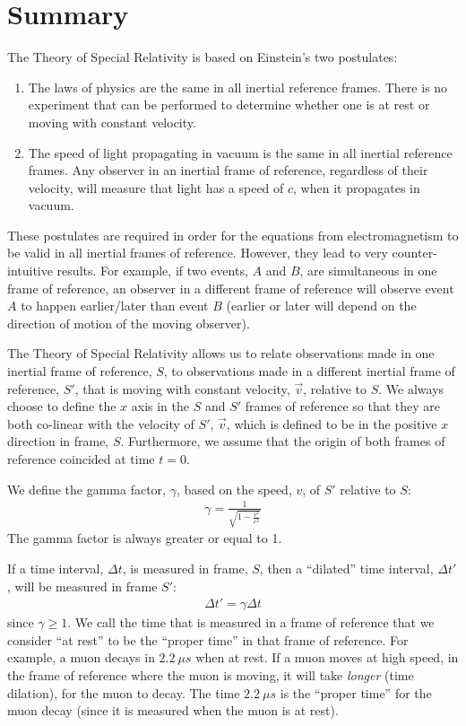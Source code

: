 \section{Summary}
\vspace{-0.25cm}
\begin{chapterSummary}
The Theory of Special Relativity is based on Einstein's two postulates:
\begin{enumerate}
\item The laws of physics are the same in all inertial reference frames. There is no experiment that can be performed to determine whether one is at rest or moving with constant velocity.
\item The speed of light propagating in vacuum is the same in all inertial reference frames. Any observer in an inertial frame of reference, regardless of their velocity, will measure that light has a speed of $c$, when it propagates in vacuum. 
\end{enumerate}
These postulates are required in order for the equations from electromagnetism to be valid in all inertial frames of reference. However, they lead to very counter-intuitive results. For example, if two events, $A$ and $B$, are simultaneous in one frame of reference, an observer in a different frame of reference will observe event $A$ to happen earlier/later than event $B$ (earlier or later will depend on the direction of motion of the moving observer).  

The Theory of Special Relativity allows us to relate observations made in one inertial frame of reference, $S$, to observations made in a different inertial frame of reference, $S'$, that is moving with constant velocity, $\vec v$, relative to $S$. We always choose to define the $x$ axis in the $S$ and $S'$ frames of reference so that they are both co-linear with the velocity of $S'$, $\vec v$, which is defined to be in the positive $x$ direction in frame, $S$. Furthermore, we assume that the origin of both frames of reference coincided at time $t=0$.

We define the gamma factor, $\gamma$, based on the speed, $v$, of $S'$ relative to $S$:
\begin{align*}
\gamma = \frac{1}{\sqrt{1-\frac{v^2}{c^2}}}
\end{align*}
The gamma factor is always greater or equal to 1. 

If a time interval, $\Delta t$, is measured in frame, $S$, then a ``dilated'' time interval, $\Delta t'$, will be measured in frame $S'$:
\begin{align*}
\Delta t'=\gamma \Delta t
\end{align*}
since $\gamma \geq 1$. We call the time that is measured in a frame of reference that we consider ``at rest'' to be the ``proper time'' in that frame of reference. For example, a muon decays in $\SI{2.2}{\mu s}$ when at rest. If a muon moves at high speed, in the frame of reference where the muon is moving, it will take \textit{longer} (time dilation), for the muon to decay. The time $\SI{2.2}{\mu s}$ is the ``proper time'' for the muon decay (since it is measured when the muon is at rest).


\end{chapterSummary}
